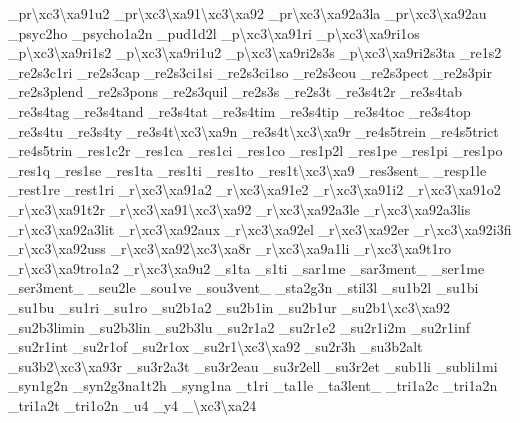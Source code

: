 {\-\_\-pr\textbackslash{}xc3\textbackslash{}xa91u2 \-\_\-pr\textbackslash{}xc3\textbackslash{}xa91\textbackslash{}xc3\textbackslash{}xa92 \-\_\-pr\textbackslash{}xc3\textbackslash{}xa92a3la \-\_\-pr\textbackslash{}xc3\textbackslash{}xa92au \-\_\-psyc2ho \-\_\-psycho1a2n \-\_\-pud1d2l \-\_\-p\textbackslash{}xc3\textbackslash{}xa91ri \-\_\-p\textbackslash{}xc3\textbackslash{}xa9ri1os \-\_\-p\textbackslash{}xc3\textbackslash{}xa9ri1s2 \-\_\-p\textbackslash{}xc3\textbackslash{}xa9ri1u2 \-\_\-p\textbackslash{}xc3\textbackslash{}xa9ri2s3s \-\_\-p\textbackslash{}xc3\textbackslash{}xa9ri2s3ta \-\_\-re1s2 \-\_\-re2s3c1ri \-\_\-re2s3cap \-\_\-re2s3ci1si \-\_\-re2s3ci1so \-\_\-re2s3cou \-\_\-re2s3pect \-\_\-re2s3pir \-\_\-re2s3plend \-\_\-re2s3pons \-\_\-re2s3quil \-\_\-re2s3s \-\_\-re2s3t \-\_\-re3s4t2r \-\_\-re3s4tab \-\_\-re3s4tag \-\_\-re3s4tand \-\_\-re3s4tat \-\_\-re3s4tim \-\_\-re3s4tip \-\_\-re3s4toc \-\_\-re3s4top \-\_\-re3s4tu \-\_\-re3s4ty \-\_\-re3s4t\textbackslash{}xc3\textbackslash{}xa9n \-\_\-re3s4t\textbackslash{}xc3\textbackslash{}xa9r \-\_\-re4s5trein \-\_\-re4s5trict \-\_\-re4s5trin \-\_\-res1c2r \-\_\-res1ca \-\_\-res1ci \-\_\-res1co \-\_\-res1p2l \-\_\-res1pe \-\_\-res1pi \-\_\-res1po \-\_\-res1q \-\_\-res1se \-\_\-res1ta \-\_\-res1ti \-\_\-res1to \-\_\-res1t\textbackslash{}xc3\textbackslash{}xa9 \-\_\-res3sent\-\_\- \-\_\-resp1le \-\_\-rest1re \-\_\-rest1ri \-\_\-r\textbackslash{}xc3\textbackslash{}xa91a2 \-\_\-r\textbackslash{}xc3\textbackslash{}xa91e2 \-\_\-r\textbackslash{}xc3\textbackslash{}xa91i2 \-\_\-r\textbackslash{}xc3\textbackslash{}xa91o2 \-\_\-r\textbackslash{}xc3\textbackslash{}xa91t2r \-\_\-r\textbackslash{}xc3\textbackslash{}xa91\textbackslash{}xc3\textbackslash{}xa92 \-\_\-r\textbackslash{}xc3\textbackslash{}xa92a3le \-\_\-r\textbackslash{}xc3\textbackslash{}xa92a3lis \-\_\-r\textbackslash{}xc3\textbackslash{}xa92a3lit \-\_\-r\textbackslash{}xc3\textbackslash{}xa92aux \-\_\-r\textbackslash{}xc3\textbackslash{}xa92el \-\_\-r\textbackslash{}xc3\textbackslash{}xa92er \-\_\-r\textbackslash{}xc3\textbackslash{}xa92i3fi \-\_\-r\textbackslash{}xc3\textbackslash{}xa92uss \-\_\-r\textbackslash{}xc3\textbackslash{}xa92\textbackslash{}xc3\textbackslash{}xa8r \-\_\-r\textbackslash{}xc3\textbackslash{}xa9a1li \-\_\-r\textbackslash{}xc3\textbackslash{}xa9t1ro \-\_\-r\textbackslash{}xc3\textbackslash{}xa9tro1a2 \-\_\-r\textbackslash{}xc3\textbackslash{}xa9u2 \-\_\-s1ta \-\_\-s1ti \-\_\-sar1me \-\_\-sar3ment\-\_\- \-\_\-ser1me \-\_\-ser3ment\-\_\- \-\_\-seu2le \-\_\-sou1ve \-\_\-sou3vent\-\_\- \-\_\-sta2g3n \-\_\-stil3l \-\_\-su1b2l \-\_\-su1bi \-\_\-su1bu \-\_\-su1ri \-\_\-su1ro \-\_\-su2b1a2 \-\_\-su2b1in \-\_\-su2b1ur \-\_\-su2b1\textbackslash{}xc3\textbackslash{}xa92 \-\_\-su2b3limin \-\_\-su2b3lin \-\_\-su2b3lu \-\_\-su2r1a2 \-\_\-su2r1e2 \-\_\-su2r1i2m \-\_\-su2r1inf \-\_\-su2r1int \-\_\-su2r1of \-\_\-su2r1ox \-\_\-su2r1\textbackslash{}xc3\textbackslash{}xa92 \-\_\-su2r3h \-\_\-su3b2alt \-\_\-su3b2\textbackslash{}xc3\textbackslash{}xa93r \-\_\-su3r2a3t \-\_\-su3r2eau \-\_\-su3r2ell \-\_\-su3r2et \-\_\-sub1li \-\_\-subli1mi \-\_\-syn1g2n \-\_\-syn2g3na1t2h \-\_\-syng1na \-\_\-t1ri \-\_\-ta1le \-\_\-ta3lent\-\_\- \-\_\-tri1a2c \-\_\-tri1a2n \-\_\-tri1a2t \-\_\-tri1o2n \-\_\-u4 \-\_\-y4 \-\_\-\textbackslash{}xc3\textbackslash{}xa24 }
